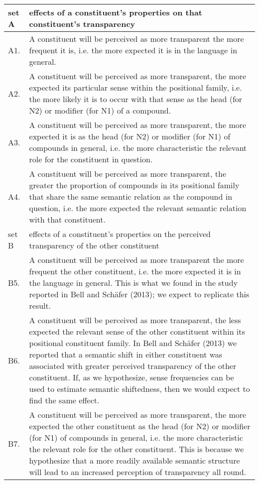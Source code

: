 \begin{table}[p]
\small
\begin{tabularx}{\textwidth}{lQ}
\lsptoprule
{set A}&{effects of a constituent's properties on that constituent's transparency}\\ \midrule %
A1.& A constituent will be perceived as more transparent the more frequent it is, i.e. the more expected it is in the language in general.\\
A2.&A constituent will be perceived as more transparent, the more expected its particular sense within the positional family, i.e. the more likely it is to occur with that sense as the head (for N2) or modifier (for N1) of a compound.\\
A3.&A constituent will be perceived as more transparent, the more expected it is as the head (for N2) or modifier (for N1) of compounds in general, i.e. the more characteristic the relevant role for the constituent in question.\\
A4.&A constituent will be perceived as more transparent, the greater
    the proportion of compounds in its positional family that share
    the same semantic relation as the compound in question, i.e. the
    more expected the relevant semantic relation with that
    constituent.\\ \tablevspace %
{set B}&{effects of a constituent’s properties on the perceived transparency of the other constituent}\\\midrule %
B5.&A constituent will be perceived as more transparent the more frequent the other constituent, i.e. the more expected it is in the language in general. This is what we found in the study reported in Bell and Schäfer (2013); we expect to replicate this result.\\
B6.&A constituent will be perceived as more transparent, the less expected the relevant sense of the other constituent within its positional constituent family. In Bell and Schäfer (2013) we reported that a semantic shift in either constituent was associated with greater perceived transparency of the other constituent. If, as we hypothesize, sense frequencies can be used to estimate semantic shiftedness, then we would expect to find the same effect.\\
B7.&A constituent will be perceived as more transparent, the more expected the other constituent as the head (for N2) or modifier (for N1) of compounds in general, i.e. the more characteristic the relevant role for the other constituent. This is because we hypothesize that a more readily available semantic structure will lead to an increased perception of transparency all round.\\

\end{tabularx}
\end{table}
